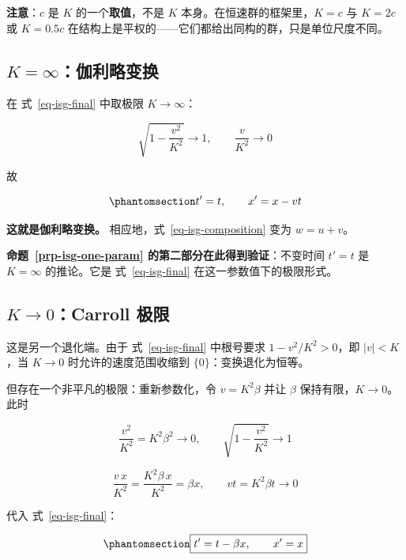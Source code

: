 \documentclass[
  chinese,
  a4paper,
  UTF8,
  12pt,
  oneside,
  openany]{ctexbook}
\theoremstyle{plain}
\theoremstyle{plain}
\theoremstyle{plain}
\theoremstyle{definition}
\theoremstyle{plain}
\theoremstyle{plain}
\theoremstyle{remark}
\begin{document}
\textbf{注意}：\(c\) 是 \(K\) 的一个\textbf{取值}，不是 \(K\)
本身。在恒速群的框架里，\(K=c\) 与 \(K=2c\) 或 \(K=0.5c\)
在结构上是平权的------它们都给出同构的群，只是单位尺度不同。

\subsection{\texorpdfstring{\(K=\infty\)：伽利略变换}{K=\textbackslash infty：伽利略变换}}\label{kinftyux4f3dux5229ux7565ux53d8ux6362}

在 式~\ref{eq-isg-final} 中取极限 \(K\to\infty\)：

\[
\sqrt{1-\frac{v^{2}}{K^{2}}}\longrightarrow 1,\qquad
\frac{v}{K^{2}}\longrightarrow 0
\]

故

\begin{equation}\protect\phantomsection\label{eq-isg-galilei}{
t'=t,\qquad x'=x-vt
}\end{equation}

\textbf{这就是伽利略变换。} 相应地，式~\ref{eq-isg-composition} 变为
\(w=u+v\)。

\textbf{命题~\ref{prp-isg-one-param} 的第二部分在此得到验证}：不变时间
\(t'=t\) 是 \(K=\infty\) 的推论。它是 式~\ref{eq-isg-final}
在这一参数值下的极限形式。

\subsection{\texorpdfstring{\(K\to0\)：Carroll
极限}{K\textbackslash to0：Carroll 极限}}\label{kto0carroll-ux6781ux9650}

这是另一个退化端。由于 式~\ref{eq-isg-final} 中根号要求
\(1-v^{2}/K^{2}>0\)，即 \(|v|<K\)，当 \(K\to0\) 时允许的速度范围收缩到
\(\{0\}\)：变换退化为恒等。

但存在一个非平凡的极限：重新参数化，令 \(v=K^{2}\beta\) 并让 \(\beta\)
保持有限，\(K\to0\)。此时

\[
\frac{v^{2}}{K^{2}}=K^{2}\beta^{2}\longrightarrow0,\qquad
\sqrt{1-\frac{v^{2}}{K^{2}}}\longrightarrow1
\]

\[
\frac{v\,x}{K^{2}}=\frac{K^{2}\beta\,x}{K^{2}}=\beta x,\qquad
vt=K^{2}\beta t\longrightarrow0
\]

代入 式~\ref{eq-isg-final}：

\begin{equation}\protect\phantomsection\label{eq-isg-carroll}{
\boxed{t'=t-\beta x,\qquad x'=x}
}\end{equation}
\end{document}
